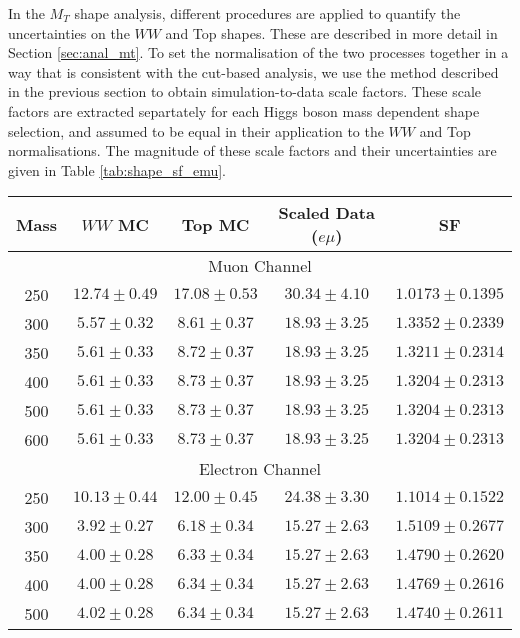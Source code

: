 In the $M_T$ shape analysis, different procedures are applied to quantify
the uncertainties on the $WW$ and Top shapes. 
These are described in more detail in Section \ref{sec:anal_mt}.
To set the normalisation of the two processes together in a way
that is consistent with the cut-based analysis, we use the method 
described in the previous section to obtain simulation-to-data scale 
factors. These scale factors are extracted separtately for each
Higgs boson mass dependent shape selection, and assumed to be equal
in their application to the $WW$ and Top normalisations.
The magnitude of these scale factors and their uncertainties 
are given in Table \ref{tab:shape_sf_emu}.

\begin{table}[!ht]
\begin{center}
\small{
\begin{tabular}{c|c|c|c|c} 
\hline
Mass &   $WW$ MC           & Top MC            & Scaled Data ($e\mu$)   & SF \\
\hline \hline
\multicolumn{5}{c}{Muon Channel} \\ 
\hline \hline
250 & $12.74 \pm 0.49$ & $17.08 \pm 0.53$ & $30.34 \pm 4.10$  & $1.0173 \pm 0.1395$ \\ \hline 
300 & $5.57 \pm 0.32$ & $8.61 \pm 0.37$ & $18.93 \pm 3.25$  & $1.3352 \pm 0.2339$ \\ \hline 
350 & $5.61 \pm 0.33$ & $8.72 \pm 0.37$ & $18.93 \pm 3.25$  & $1.3211 \pm 0.2314$ \\ \hline 
400 & $5.61 \pm 0.33$ & $8.73 \pm 0.37$ & $18.93 \pm 3.25$  & $1.3204 \pm 0.2313$ \\ \hline 
500 & $5.61 \pm 0.33$ & $8.73 \pm 0.37$ & $18.93 \pm 3.25$  & $1.3204 \pm 0.2313$ \\ \hline 
600 & $5.61 \pm 0.33$ & $8.73 \pm 0.37$ & $18.93 \pm 3.25$  & $1.3204 \pm 0.2313$ \\ 
\hline \hline
\multicolumn{5}{c}{Electron Channel} \\ 
\hline \hline
250 & $10.13 \pm 0.44$ & $12.00 \pm 0.45$ & $24.38 \pm 3.30$  & $1.1014 \pm 0.1522$ \\ \hline
300 & $3.92 \pm 0.27$ & $6.18 \pm 0.34$ & $15.27 \pm 2.63$  & $1.5109 \pm 0.2677$ \\ \hline
350 & $4.00 \pm 0.28$ & $6.33 \pm 0.34$ & $15.27 \pm 2.63$  & $1.4790 \pm 0.2620$ \\ \hline
400 & $4.00 \pm 0.28$ & $6.34 \pm 0.34$ & $15.27 \pm 2.63$  & $1.4769 \pm 0.2616$ \\ \hline
500 & $4.02 \pm 0.28$ & $6.34 \pm 0.34$ & $15.27 \pm 2.63$  & $1.4740 \pm 0.2611$ \\ \hline

\end{tabular}}
\end{center}
\end{table}
